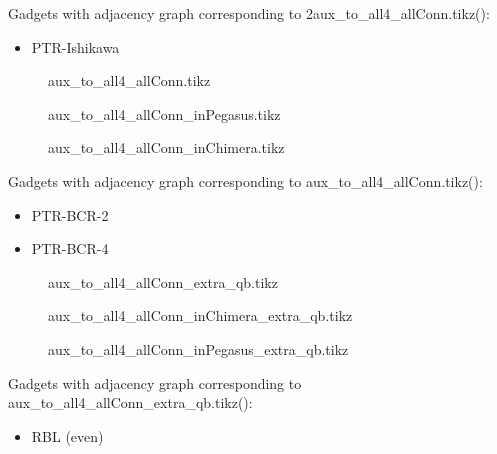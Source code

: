 \documentclass{article}
\begin{document}
Gadgets with adjacency graph corresponding to 2aux\_to\_all4\_allConn.tikz(\scalebox{.25}{}):

\begin{itemize}
\item PTR-Ishikawa
\end{itemize}

\begin{figure}

\caption{aux\_to\_all4\_allConn.tikz}
\end{figure}

\begin{figure}

\caption{aux\_to\_all4\_allConn\_inPegasus.tikz}
\end{figure}

\begin{figure}

\caption{aux\_to\_all4\_allConn\_inChimera.tikz}
\end{figure}

Gadgets with adjacency graph corresponding to aux\_to\_all4\_allConn.tikz(\scalebox{.25}{}):

\begin{itemize}
\item PTR-BCR-2
\item PTR-BCR-4
\end{itemize}

\begin{figure}

\caption{aux\_to\_all4\_allConn\_extra\_qb.tikz}
\end{figure}


\begin{figure}

\caption{aux\_to\_all4\_allConn\_inChimera\_extra\_qb.tikz}
\end{figure}

\begin{figure}

\caption{aux\_to\_all4\_allConn\_inPegasus\_extra\_qb.tikz}
\end{figure}



Gadgets with adjacency graph corresponding to aux\_to\_all4\_allConn\_extra\_qb.tikz(\scalebox{.25}{}):


\begin{itemize}
\item RBL (even)
\end{itemize}
\end{document}
